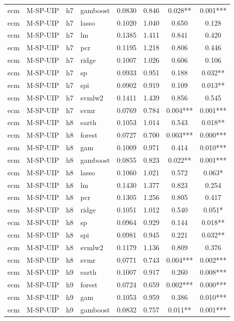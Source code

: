 \begin{ThreePartTable}
\begin{longtable}[t]{llclcccc}
ecm & M-SP-UIP & h7 & gamboost & 0.0830 & 0.846 & 0.028** & 0.001***\\
ecm & M-SP-UIP & h7 & lasso & 0.1020 & 1.040 & 0.650 & 0.128\\
ecm & M-SP-UIP & h7 & lm & 0.1385 & 1.411 & 0.841 & 0.420\\
ecm & M-SP-UIP & h7 & pcr & 0.1195 & 1.218 & 0.806 & 0.446\\
ecm & M-SP-UIP & h7 & ridge & 0.1007 & 1.026 & 0.606 & 0.106\\
ecm & M-SP-UIP & h7 & sp & 0.0933 & 0.951 & 0.188 & 0.032**\\
ecm & M-SP-UIP & h7 & spi & 0.0902 & 0.919 & 0.109 & 0.013**\\
ecm & M-SP-UIP & h7 & svmlw2 & 0.1411 & 1.439 & 0.856 & 0.545\\
ecm & M-SP-UIP & h7 & svmr & 0.0769 & 0.784 & 0.004*** & 0.001***\\
\addlinespace
ecm & M-SP-UIP & h8 & earth & 0.1053 & 1.014 & 0.543 & 0.018**\\
ecm & M-SP-UIP & h8 & forest & 0.0727 & 0.700 & 0.003*** & 0.000***\\
ecm & M-SP-UIP & h8 & gam & 0.1009 & 0.971 & 0.414 & 0.010***\\
ecm & M-SP-UIP & h8 & gamboost & 0.0855 & 0.823 & 0.022** & 0.001***\\
ecm & M-SP-UIP & h8 & lasso & 0.1060 & 1.021 & 0.572 & 0.063*\\
ecm & M-SP-UIP & h8 & lm & 0.1430 & 1.377 & 0.823 & 0.254\\
ecm & M-SP-UIP & h8 & pcr & 0.1305 & 1.256 & 0.805 & 0.417\\
ecm & M-SP-UIP & h8 & ridge & 0.1051 & 1.012 & 0.540 & 0.051*\\
ecm & M-SP-UIP & h8 & sp & 0.0964 & 0.929 & 0.144 & 0.018**\\
ecm & M-SP-UIP & h8 & spi & 0.0981 & 0.945 & 0.221 & 0.032**\\
ecm & M-SP-UIP & h8 & svmlw2 & 0.1179 & 1.136 & 0.809 & 0.376\\
ecm & M-SP-UIP & h8 & svmr & 0.0771 & 0.743 & 0.004*** & 0.002***\\
\addlinespace
ecm & M-SP-UIP & h9 & earth & 0.1007 & 0.917 & 0.260 & 0.008***\\
ecm & M-SP-UIP & h9 & forest & 0.0724 & 0.659 & 0.002*** & 0.000***\\
ecm & M-SP-UIP & h9 & gam & 0.1053 & 0.959 & 0.386 & 0.010***\\
ecm & M-SP-UIP & h9 & gamboost & 0.0832 & 0.757 & 0.011** & 0.001***\\

\end{longtable}
\end{ThreePartTable}
